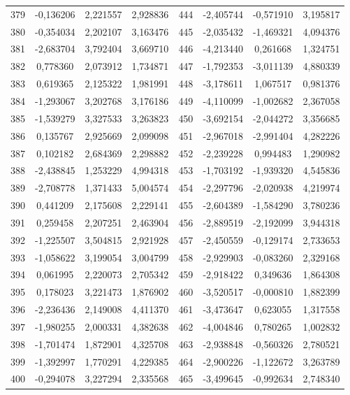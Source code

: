 \begin{apendicesenv}
\begin{table}[H]
\begin{tabular}{c c c c c c c c}
		379 & -0,136206 & 2,221557 & 2,928836 & 444 & -2,405744 & -0,571910 & 3,195817 \\
		380 & -0,354034 & 2,202107 & 3,163476 & 445 & -2,035432 & -1,469321 & 4,094376 \\
		381 & -2,683704 & 3,792404 & 3,669710 & 446 & -4,213440 & 0,261668 & 1,324751 \\
		382 & 0,778360 & 2,073912 & 1,734871 & 447 & -1,792353 & -3,011139 & 4,880339 \\
		383 & 0,619365 & 2,125322 & 1,981991 & 448 & -3,178611 & 1,067517 & 0,981376 \\
		384 & -1,293067 & 3,202768 & 3,176186 & 449 & -4,110099 & -1,002682 & 2,367058 \\
		385 & -1,539279 & 3,327533 & 3,263823 & 450 & -3,692154 & -2,044272 & 3,356685 \\
		386 & 0,135767 & 2,925669 & 2,099098 & 451 & -2,967018 & -2,991404 & 4,282226 \\
		387 & 0,102182 & 2,684369 & 2,298882 & 452 & -2,239228 & 0,994483 & 1,290982 \\
		388 & -2,438845 & 1,253229 & 4,994318 & 453 & -1,703192 & -1,939320 & 4,545836 \\
		389 & -2,708778 & 1,371433 & 5,004574 & 454 & -2,297796 & -2,020938 & 4,219974 \\
		390 & 0,441209 & 2,175608 & 2,229141 & 455 & -2,604389 & -1,584290 & 3,780236 \\
		391 & 0,259458 & 2,207251 & 2,463904 & 456 & -2,889519 & -2,192099 & 3,944318 \\
		392 & -1,225507 & 3,504815 & 2,921928 & 457 & -2,450559 & -0,129174 & 2,733653 \\
		393 & -1,058622 & 3,199054 & 3,004799 & 458 & -2,929903 & -0,083260 & 2,329168 \\
		394 & 0,061995 & 2,220073 & 2,705342 & 459 & -2,918422 & 0,349636 & 1,864308 \\
		395 & 0,178023 & 3,221473 & 1,876902 & 460 & -3,520517 & -0,000810 & 1,882399 \\
		396 & -2,236436 & 2,149008 & 4,411370 & 461 & -3,473647 & 0,623055 & 1,317558 \\
		397 & -1,980255 & 2,000331 & 4,382638 & 462 & -4,004846 & 0,780265 & 1,002832 \\
		398 & -1,701474 & 1,872901 & 4,325708 & 463 & -2,938848 & -0,560326 & 2,780521 \\
		399 & -1,392997 & 1,770291 & 4,229385 & 464 & -2,900226 & -1,122672 & 3,263789 \\
		400 & -0,294078 & 3,227294 & 2,335568 & 465 & -3,499645 & -0,992634 & 2,748340 \\

\end{tabular}
\end{table}
\end{apendicesenv}
